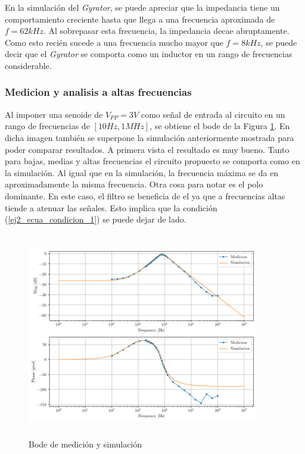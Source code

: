 \documentclass[12pt,a4paper]{article}
\begin{document}
En la simulación del \textit{Gyrator}, se puede apreciar que la impedancia tiene un comportamiento creciente hasta que llega a una frecuencia aproximada de $f = 62 kHz$. Al sobrepasar esta frecuencia, la impedancia decae abruptamente. Como esto recién sucede a una frecuencia mucho mayor que $f=8kHz$, se puede decir que el \textit{Gyrator} se comporta como un inductor en un rango de frecuencias considerable. 

\subsubsection{Medicion y analisis a altas frecuencias}

Al imponer una senoide de $V_{PP} = 3V$ como señal de entrada al circuito en un rango de frecuencias de $[10Hz , 1MHz]$, se obtiene el bode de la Figura \ref{fig:ej2_hp_sim_y_medicion}. En dicha imagen también se superpone la simulación anteriormente mostrada para poder comparar resultados. A primera vista el resultado es muy bueno. Tanto para bajas, medias y altas frecuencias el circuito propuesto se comporta como en la simulación. Al igual que en la simulación, la frecuencia máxima se da en aproximadamente la misma frecuencia. Otra cosa para notar es el polo dominante. En este caso, el filtro se beneficia de el ya que a frecuencias altas tiende a atenuar las señales. Esto implica que la condición (\ref{ej2_ecua_condicion_1}) se puede dejar de lado.  

\begin{figure}[h!]                                                       
    \centering\includegraphics[width=0.9\textwidth, height=9cm]{Resources/ej2_bp_med_and_sim.png}
    \caption{Bode de medición y simulación}
    \label{fig:ej2_hp_sim_y_medicion}
    \end{figure}
\end{document}
